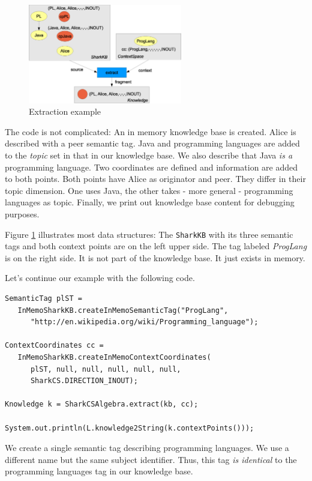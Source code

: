 \begin{figure}[t]
\centering
\includegraphics[width=0.60\textwidth]{extraction.eps}
\caption{Extraction example}
\label{fig:extraction}
\end{figure}

The code is not complicated:
An in memory knowledge base is created. Alice is described with a peer semantic tag. Java and programming languages are added to the {\it topic} set in that in our knowledge base. We also describe that Java {\it is a} programming language. Two coordinates are defined and information are added to both points. Both points have Alice as originator and peer. They differ in their topic dimension. One uses Java, the other takes - more general - programming languages as topic. Finally, we print out knowledge base content for debugging purposes.

Figure \ref{fig:extraction} illustrates most data structures: The {\tt SharkKB} with its three semantic tags and both context points are on the left upper side.
The tag labeled {\it ProgLang} is on the right side. It is not part of the knowledge base. It just exists in memory.

Let's continue our example with the following code.

\begin{verbatim}
SemanticTag plST =
   InMemoSharkKB.createInMemoSemanticTag("ProgLang",
      "http://en.wikipedia.org/wiki/Programming_language");

ContextCoordinates cc =
   InMemoSharkKB.createInMemoContextCoordinates(
      plST, null, null, null, null, null,
      SharkCS.DIRECTION_INOUT);

Knowledge k = SharkCSAlgebra.extract(kb, cc);

System.out.println(L.knowledge2String(k.contextPoints()));
\end{verbatim}

We create a single semantic tag describing programming languages.
We use a different name but the same subject identifier. Thus, this
tag {\it is identical} to the programming languages tag in our knowledge base.

